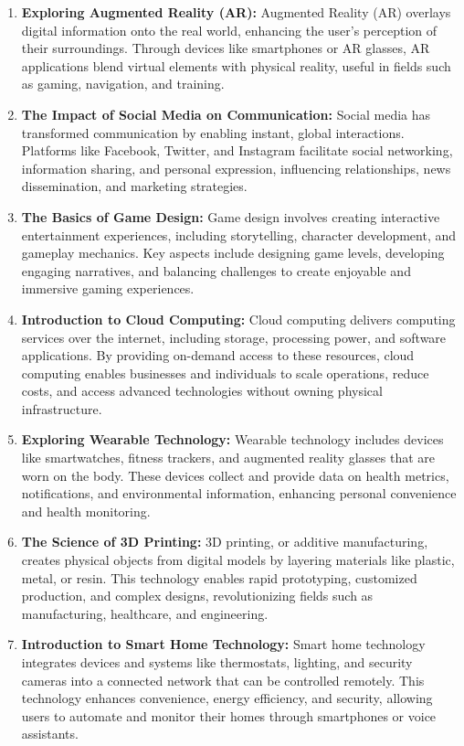 \begin{enumerate}
    \item \textbf{Exploring Augmented Reality (AR):} Augmented Reality (AR) overlays digital information onto the real world, enhancing the user's perception of their surroundings. Through devices like smartphones or AR glasses, AR applications blend virtual elements with physical reality, useful in fields such as gaming, navigation, and training.
    \item \textbf{The Impact of Social Media on Communication:} Social media has transformed communication by enabling instant, global interactions. Platforms like Facebook, Twitter, and Instagram facilitate social networking, information sharing, and personal expression, influencing relationships, news dissemination, and marketing strategies.
    \item \textbf{The Basics of Game Design:} Game design involves creating interactive entertainment experiences, including storytelling, character development, and gameplay mechanics. Key aspects include designing game levels, developing engaging narratives, and balancing challenges to create enjoyable and immersive gaming experiences.
    \item \textbf{Introduction to Cloud Computing:} Cloud computing delivers computing services over the internet, including storage, processing power, and software applications. By providing on-demand access to these resources, cloud computing enables businesses and individuals to scale operations, reduce costs, and access advanced technologies without owning physical infrastructure.
    \item \textbf{Exploring Wearable Technology:} Wearable technology includes devices like smartwatches, fitness trackers, and augmented reality glasses that are worn on the body. These devices collect and provide data on health metrics, notifications, and environmental information, enhancing personal convenience and health monitoring.
    \item \textbf{The Science of 3D Printing:} 3D printing, or additive manufacturing, creates physical objects from digital models by layering materials like plastic, metal, or resin. This technology enables rapid prototyping, customized production, and complex designs, revolutionizing fields such as manufacturing, healthcare, and engineering.
    \item \textbf{Introduction to Smart Home Technology:} Smart home technology integrates devices and systems like thermostats, lighting, and security cameras into a connected network that can be controlled remotely. This technology enhances convenience, energy efficiency, and security, allowing users to automate and monitor their homes through smartphones or voice assistants.

\end{enumerate}
